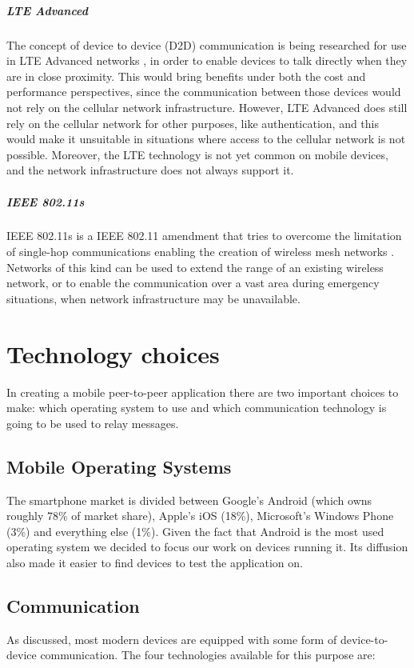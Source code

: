 \paragraph{LTE Advanced} The concept of device to device (D2D) communication is being researched for use in LTE Advanced networks \cite{lte_advanced}, in order to enable devices to talk directly when they are in close proximity.
This would bring benefits under both the cost and performance perspectives, since the communication between those devices would not rely on the cellular network infrastructure.
However, LTE Advanced does still rely on the cellular network for other purposes, like authentication, and this would make it unsuitable in situations where access to the cellular network is not possible.
Moreover, the LTE technology is not yet common on mobile devices, and the network infrastructure does not always support it.

\paragraph{IEEE 802.11s} IEEE 802.11s is a IEEE 802.11 amendment that tries to overcome the limitation of single-hop communications enabling the creation of wireless mesh networks \cite{ieee80211s}.
Networks of this kind can be used to extend the range of an existing wireless network, or to enable the communication over a vast area during emergency situations, when network infrastructure may be unavailable.

\chapter{Technology choices}
In creating a mobile peer-to-peer application there are two important choices to make: which operating system to use and which communication technology is going to be used to relay messages.

\section{Mobile Operating Systems}
The smartphone market is divided between Google's Android (which owns roughly 78\% of market share), Apple's iOS (18\%), Microsoft's Windows Phone (3\%) and everything else (1\%).
Given the fact that Android is the most used operating system we decided to focus our work on devices running it.
Its diffusion also made it easier to find devices to test the application on.

\section{Communication}
As discussed, most modern devices are equipped with some form of device-to-device communication.
The four technologies available for this purpose are:

